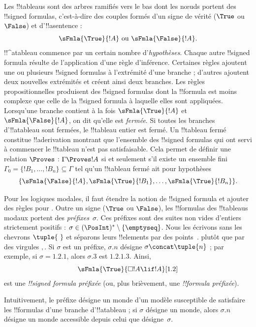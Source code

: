 \documentclass[../../../include/open-logic-section]{subfiles}
\begin{document}


Les !!{tableau}s sont des arbres ramifiés vers le bas dont les nœuds
portent des !!{signed formula}s, c'est-à-dire des couples formés d'un
signe de vérité ($\True$ ou $\False$) et d'!!a{sentence} :
\[
\sFmla{\True}{!A} \text{ ou } \sFmla{\False}{!A}.
\]
!!^a{tableau} commence par un certain nombre d'\emph{hypothèses}.
Chaque autre !!{signed formula} résulte de l'application d'une règle
d'inférence. Certaines règles ajoutent une ou plusieurs !!{signed
formula}s à l'extrémité d'une branche ; d'autres ajoutent deux
nouvelles extrémités et créent ainsi deux branches. Les règles
propositionnelles produisent des !!{signed formula}s dont la !!{formula}
est moins complexe que celle de la !!{signed formula} à laquelle elles
sont appliquées. Lorsqu'une branche contient à la fois
$\sFmla{\True}{!A}$ et $\sFmla{\False}{!A}$, on dit qu'elle est
\emph{fermée}. Si toutes les branches d'!!a{tableau} sont fermées,
le !!{tableau} entier est fermé. Un !!{tableau} fermé constitue
!!a{derivation} montrant que l'ensemble des !!{signed formula}s qui
ont servi à commencer le !!{tableau} n'est pas satisfaisable. Cela
permet de définir une relation $\Proves$ : $\Gamma \Proves !A$ si et
seulement s'il existe un ensemble fini~$\Gamma_0 = \{!B_1,
\dots, !B_n\} \subseteq \Gamma$ tel qu'un !!{tableau} fermé ait
pour hypothèses
\[
\{\sFmla{\False}{!A}, \sFmla{\True}{!B_1}, \dots, \sFmla{\True}{!B_n}\}.
\]

Pour les logiques modales, il faut étendre la notion de !!{signed
formula} et ajouter des règles pour
. Outre un signe ($\True$ ou
$\False$), les !!{formula}s des !!{tableau}s modaux portent des
\emph{préfixes}~$\sigma$. Ces préfixes sont des suites non vides
d'entiers strictement positifs : $\sigma \in (\PosInt)^* \setminus
\{\emptyseq\}$. Nous les écrivons sans les chevrons
$\tuple{\ }$ et séparons leurs !!{element}s par des points~$.$
plutôt que par des virgules $,$. Si $\sigma$ est un préfixe,
$\sigma.n$ désigne $\sigma
\concat \tuple{n}$ ; par exemple, si $\sigma = 1.2.1$, alors
$\sigma.3$ est $1.2.1.3$. Ainsi,
\[
\sFmla{\True}{\Box !A \lif !A}[1.2]
\]
est une \emph{!!{signed formula} préfixée} (ou, plus brièvement, une
\emph{!!{formula} préfixée}).

Intuitivement, le préfixe désigne un monde d'un modèle susceptible de
satisfaire les !!{formula}s d'une branche d'!!a{tableau} ; si
$\sigma$ désigne un monde, alors $\sigma.n$ désigne un monde
accessible depuis celui que désigne~$\sigma$.
\end{document}
